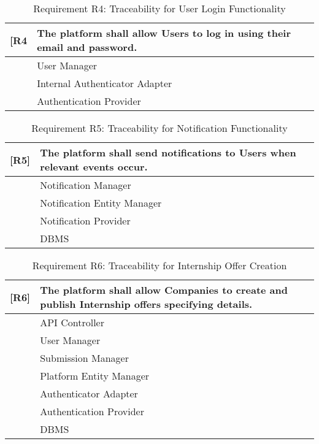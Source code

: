 \begin{table}[H]
    \centering
    \begin{tabular}{|p{1cm}|p{14cm}|}
    \hline
    \textbf{[R4} & \textbf{The platform shall allow Users to log in using their email and password.} \\ \hline
    [C3] & User Manager \\ \hline
    [C11] & Internal Authenticator Adapter \\ \hline
    [E3] & Authentication Provider \\ \hline
    \end{tabular}
    \caption{Requirement R4: Traceability for User Login Functionality}
    \label{tab:RT4}
\end{table}

\begin{table}[H]
    \centering
    \begin{tabular}{|p{1cm}|p{14cm}|}
    \hline
    \textbf{[R5]} & \textbf{The platform shall send notifications to Users when relevant events occur.} \\ \hline
    [C12] & Notification Manager \\ \hline
    [C13] & Notification Entity Manager \\ \hline
    [E1] & Notification Provider \\ \hline
    [E4] & DBMS \\ \hline
    \end{tabular}
    \caption{Requirement R5: Traceability for Notification Functionality}
    \label{tab:RT5}
\end{table}

\begin{table}[H]
    \centering
    \begin{tabular}{|p{1cm}|p{14cm}|}
    \hline
    \textbf{[R6]} & \textbf{The platform shall allow Companies to create and publish Internship offers specifying details.} \\ \hline
    [C1] & API Controller \\ \hline
    [C3] & User Manager \\ \hline
    [C5] & Submission Manager \\ \hline
    [C10] & Platform Entity Manager \\ \hline
    [C11] & Authenticator Adapter \\ \hline
    [E3] & Authentication Provider \\ \hline
    [E4] & DBMS \\ \hline
    \end{tabular}
    \caption{Requirement R6: Traceability for Internship Offer Creation}
    \label{tab:RT6}
\end{table}

